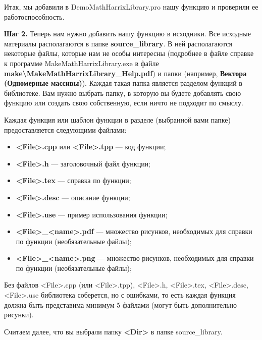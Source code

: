 \documentclass[a4paper,12pt]{article}
\begin{document}
Итак, мы добавили в DemoMathHarrixLibrary.pro нашу функцию и проверили ее работоспособность. 

\textbf{Шаг 2.}\label{step2} Теперь нам нужно добавить нашу функцию в исходники. Все исходные материалы располагаются в папке \textbf{source\_library}. В ней располагаются некоторые файлы, которые нам не особы интересны (подробнее в файле справке к программе MakeMathHarrixLibrary.exe в файле \textbf{make\textbackslash MakeMathHarrixLibrary\_Help.pdf}) и папки (например, \textbf{Вектора (Одномерные массивы)}). Каждая такая папка является разделом функций в библиотеке. Вам нужно выбрать папку, в которую вы будете добавлять свою функцию или создать свою собственную, если ничто не подходит по смыслу.

Каждая функция или шаблон функции в разделе (выбранной вами папке) предоставляется следующими файлами:
\begin{itemize}
\item \textbf{<File>.cpp} или \textbf{<File>.tpp} --- код функции;
\item \textbf{<File>.h} --- заголовочный файл функции;
\item \textbf{<File>.tex} --- справка по функции;
\item \textbf{<File>.desc} --- описание функции;
\item \textbf{<File>.use} --- пример использования функции;
\item \textbf{<File>\_<name>.pdf} --- множество рисунков, необходимых для справки по функции (необязательные файлы);
\item \textbf{<File>\_<name>.png} --- множество рисунков, необходимых для справки по функции (необязательные файлы);
\end{itemize}

Без файлов <File>.cpp (или <File>.tpp), <File>.h, <File>.tex, <File>.desc, <File>.use библиотека соберется, но с ошибками, то есть каждая функция должна быть представима минимум 5 файлами (могут быть дополнительно рисунки).

Считаем далее, что вы выбрали папку \textbf{<Dir>} в папке source\_library. 
\end{document}
